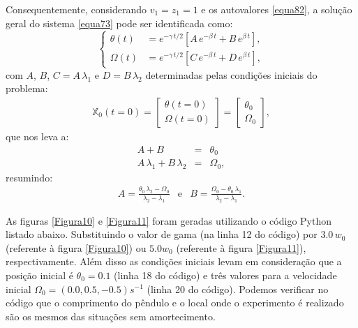 \documentclass[12pt,openright,twoside,english,brazil]{abntex2}
\begin{document}
Consequentemente, considerando $v_1 = z_1 = 1$ e os autovalores \ref{equa82}, a solução geral do sistema \ref{equa73} pode ser identificada como:
\begin{equation}
 \begin{cases}
  \theta(t) & = e^{-\gamma \, t/2} \left[ A\, e^{-\beta\, t} + B\, e^{\beta\, t} \right], \\
  \Omega(t) & = e^{-\gamma \, t/2} \left[ C\, e^{-\beta\, t} + D\, e^{\beta\, t} \right],
 \end{cases}
 \label{equa94}
\end{equation}
com $A$, $B$, $C=A\, \lambda_1$ e $D=B\, \lambda_2$ determinadas pelas condições iniciais do problema:
\begin{eqnarray}
 \mathbb{X}_0(t=0) = \begin{bmatrix}
  \theta(t=0) \\
  \Omega(t=0)
  \end{bmatrix} = \begin{bmatrix}
                   \theta_0 \\
                   \Omega_0
                 \end{bmatrix},
 \label{equa95}
\end{eqnarray}
que nos leva a:
\begin{eqnarray}
 A + B & = & \theta_0 \nonumber \\
 A\, \lambda_1 + B\, \lambda_2 & = & \Omega_0, \nonumber
\end{eqnarray}
resumindo:
\begin{eqnarray}
 A = \frac{\theta_0\, \lambda_2 - \Omega_0}{\lambda_2 - \lambda_1} & \text{e} & B = \frac{\Omega_0 - \theta_0\, \lambda_1}{\lambda_2 - \lambda_1}.
 \label{equa96}
\end{eqnarray}

As figuras \ref{Figura10} e \ref{Figura11} foram geradas utilizando o código Python listado abaixo. Substituindo o valor de gama (na linha 12 do código) por $3.0\, w_0$ (referente à figura \ref{Figura10}) ou $5.0 w_0$ (referente à figura \ref{Figura11}), respectivamente. Além disso as condições iniciais levam em consideração que a posição inicial é $\theta_0=0.1$ (linha 18 do código) e três valores para a velocidade inicial $\Omega_0=(0.0,0.5,-0.5)s^{-1}$ (linha 20 do código). Podemos verificar no código que o comprimento do pêndulo e o local onde o experimento é realizado são os mesmos das situações sem amortecimento.


\end{document}
